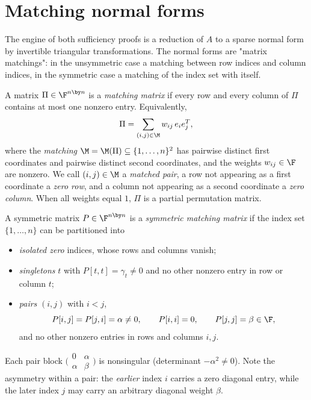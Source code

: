\section{Matching normal forms}\label{sec:normalforms}

The engine of both sufficiency proofs is a reduction of $A$ to a sparse
normal form by invertible triangular transformations.  The normal forms are
"matrix matchings": in the unsymmetric case a matching between row indices
and column indices, in the symmetric case a matching of the index set with
itself.

\begin{definition}\label{def:matching}
  A matrix $\Pi \in \F^{n \by n}$ is a \emph{matching matrix} if every row
  and every column of $\Pi$ contains at most one nonzero entry.
  Equivalently,
  \[
    \Pi = \sum_{(i,j) \in \M} w_{ij} \, e_i e_j^T,
  \]
  where the \emph{matching} $\M = \M(\Pi) \subseteq \{1,\ldots,n\}^2$ has
  pairwise distinct first coordinates and pairwise distinct second
  coordinates, and the weights $w_{ij} \in \F$ are nonzero.  We call
  $(i,j) \in \M$ a \emph{matched pair}, a row not appearing as a first
  coordinate a \emph{zero row}, and a column not appearing as a second
  coordinate a \emph{zero column}.  When all weights equal $1$, $\Pi$ is a
  partial permutation matrix.
\end{definition}

\begin{definition}\label{def:sym-matching}
  A symmetric matrix $P \in \F^{n \by n}$ is a \emph{symmetric matching
  matrix} if the index set $\{1, \ldots, n\}$ can be partitioned into
  \begin{itemize}
    \item \emph{isolated zero} indices, whose rows and columns vanish;
    \item \emph{singletons} $t$ with $P[t,t] = \gamma_t \neq 0$ and no other
      nonzero entry in row or column $t$;
    \item \emph{pairs} $(i,j)$ with $i < j$,
      \[
        P[i,j] = P[j,i] = \alpha \neq 0,
        \qquad
        P[i,i] = 0,
        \qquad
        P[j,j] = \beta \in \F ,
      \]
      and no other nonzero entries in rows and columns $i, j$.
  \end{itemize}
  Each pair block
  $\bigl(\begin{smallmatrix} 0 & \alpha\\ \alpha & \beta
  \end{smallmatrix}\bigr)$ is nonsingular (determinant $-\alpha^2 \neq 0$).
  Note the asymmetry within a pair: the \emph{earlier} index $i$ carries a
  zero diagonal entry, while the later index $j$ may carry an arbitrary
  diagonal weight $\beta$.
\end{definition}


